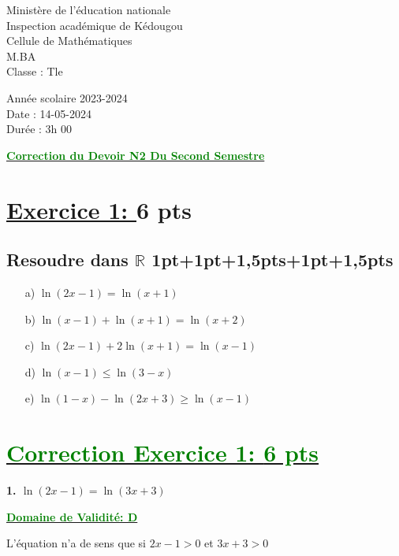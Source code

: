 \documentclass[12pt]{article}
\begin{document}
\begin{minipage}{0.5\textwidth}
	Ministère de l'éducation nationale  \\
	Inspection académique de Kédougou   \\
	Cellule de Mathématiques\\
	M.BA\\
	Classe : Tle  \\
\end{minipage}
\begin{minipage}{0.5\textwidth}
	Année scolaire 2023-2024 \\
	Date : 14-05-2024 \\
	Durée : 3h 00 \\
\end{minipage}

\begin{center}
	\textbf{{\underline{\textcolor{green}{Correction du Devoir N2 Du Second Semestre}}}}
\end{center}
\section*{\underline{Exercice 1: }\textbf{6 pts}}
\subsection*{ Resoudre dans $\mathbb{R}$ 1pt+1pt+1,5pts+1pt+1,5pts}
\begin{itemize}
\item[a)] $\ln(2x-1)=\ln(x+1)$

\item[b)] $\ln(x-1)+\ln(x+1)=\ln(x+2)$

\item[c)] $\ln(2x-1)+2\ln(x+1)=\ln(x-1)$

\item[d)] $\ln(x-1)\leq\ln(3-x)$

\item[e)] $\ln(1-x)-\ln(2x+3)\geq\ln(x-1)$
\end{itemize}
\section*{\underline{\textcolor{green}{Correction Exercice 1: \textbf{6 pts}}}}

\textbf{1. \(\ln(2x-1)=\ln(3x+3)\)}

\textbf{\underline{\textcolor{green}{Domaine de Validité: D}}}

L'équation n'a de sens que si $2x-1>0$ et $3x+3>0$
\end{document}
